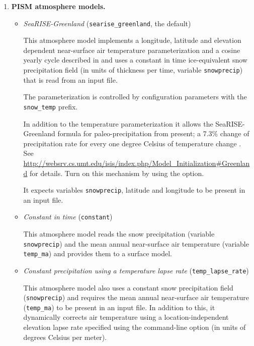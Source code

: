 \begin{enumerate}
\item \textbf{PISM atmosphere models.}
\begin{itemize}
  \item \emph{SeaRISE-Greenland} (\texttt{searise_greenland}, the default)

    This atmosphere model implements a longitude, latitude and elevation dependent near-surface air temperature parameterization and a cosine yearly cycle described in \cite{Faustoetal2009} and uses a constant in time ice-equivalent snow precipitation field (in units of thickness per time, variable \texttt{snowprecip}) that is read from an input file.

    The parameterization is controlled by configuration parameters with the \texttt{snow_temp} prefix.

    In addition to the temperature parameterization it allows the SeaRISE-Greenland formula for paleo-precipitation from present; a 7.3\% change of precipitation rate for every one degree Celsius of temperature change \cite{Huybrechts02}.  See \url{http://websrv.cs.umt.edu/isis/index.php/Model_Initialization#Greenland} for details.  Turn on this mechanism by using the  option.

    It expects variables \texttt{snowprecip}, latitude and longitude to be present in an input file.

 \item \emph{Constant in time} (\texttt{constant})

    This atmosphere model reads the snow precipitation (variable \texttt{snowprecip}) and the mean annual near-surface air temperature (variable \texttt{temp_ma}) and provides them to a surface model.
  \item \emph{Constant precipitation using a temperature lapse rate} (\texttt{temp_lapse_rate})
    
    This atmosphere model also uses a constant snow precipitation field (\texttt{snowprecip}) and requires the mean annual near-surface air temperature (\texttt{temp_ma}) to be present in an input file. In addition to this, it dynamically corrects air temperature using a location-independent elevation lapse rate specified using the  command-line option (in units of degrees Celsius per meter).
 \end{itemize}


\end{enumerate}
